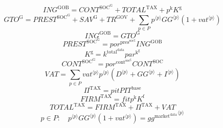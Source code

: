 \begin{equation}
{I\!N\!G}^{\mathrm{GOB}} = {C\!O\!N\!T}^{\mathrm{SOC}^{\mathrm{G}}} + {T\!O\!T\!A\!L}^{\mathrm{TAX}} + {p^{\mathrm{k}}} {K^{\mathrm{g}}}
\end{equation}
\begin{equation}
{G\!T\!O}^{\mathrm{G}} = {P\!R\!E\!S\!T}^{\mathrm{SOC}^{\mathrm{G}}} + {S\!A\!V}^{\mathrm{G}} + {T\!R}^{\mathrm{GOV}} + \sum_{p\in P} {{p}^{\langle p\rangle}} {{{G\!G}}^{\langle p\rangle}} \left(1 + {{v\!a\!t}}^{\langle p\rangle}\right)
\end{equation}
\begin{equation}
{I\!N\!G}^{\mathrm{GOB}} = {G\!T\!O}^{\mathrm{G}}
\end{equation}
\begin{equation}
{P\!R\!E\!S\!T}^{\mathrm{SOC}^{\mathrm{G}}} = {{p\!o\!r}^{\mathrm{pres}^{\mathrm{soc}^{\mathrm{g}}}}} {{I\!N\!G}^{\mathrm{GOB}}}
\end{equation}
\begin{equation}
K^{\mathrm{g}} = {k^{\mathrm{total}^{\mathrm{data}}}} {{p\!a\!r}^{\mathrm{k}^{\mathrm{g}}}}
\end{equation}
\begin{equation}
{C\!O\!N\!T}^{\mathrm{SOC}^{\mathrm{G}}} = {{p\!o\!r}^{\mathrm{cont}^{\mathrm{soc}^{\mathrm{g}}}}} {{C\!O\!N\!T}^{\mathrm{SOC}}}
\end{equation}
\begin{equation}
{V\!A\!T} = \sum_{p\in P} {{{v\!a\!t}}^{\langle p\rangle}} {{p}^{\langle p\rangle}} \left({D}^{\langle p\rangle} + {{G\!G}}^{\langle p\rangle} + {I}^{\langle p\rangle}\right)
\end{equation}
\begin{equation}
\Pi^{\mathrm{TAX}} = {{p\!i\!t}} {{P\!I\!T}^{\mathrm{base}}}
\end{equation}
\begin{equation}
{F\!I\!R\!M}^{\mathrm{TAX}} = {{f\!i\!t}} {p^{\mathrm{k}}} {K^{\mathrm{f}}}
\end{equation}
\begin{equation}
{T\!O\!T\!A\!L}^{\mathrm{TAX}} = {F\!I\!R\!M}^{\mathrm{TAX}} + \Pi^{\mathrm{TAX}} + {V\!A\!T}
\end{equation}
\begin{equation}
p\in P\colon\quad {{p}^{\langle p\rangle}} {{{G\!G}}^{\langle p\rangle}} \left(1 + {{v\!a\!t}}^{\langle p\rangle}\right) = {{g\!g}^{\mathrm{market}^{\mathrm{data}}}}^{\langle p\rangle}
\end{equation}




